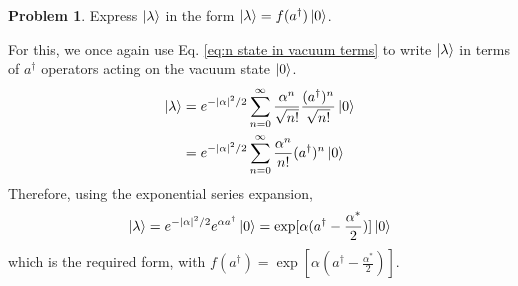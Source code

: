 \documentclass{article}
\theoremstyle{definition}
\newtheorem{definition}{Problem}[section]
\theoremstyle{remark}
\begin{document}
\begin{definition}
    Express $\ket{\lambda}$ in the form $\ket{\lambda} = f(a^\dagger)\ket{0}$.
\end{definition}
For this, we once again use Eq. \ref{eq:n state in vacuum terms} to write $\ket{\lambda}$ in terms of $a^\dagger$ operators acting on the vacuum state $\ket{0}$.
\begin{align*}
    \ket{\lambda} &= e^{-|\alpha|^2/2}\sum_{n=0}^\infty\frac{\alpha^n}{\sqrt{n!}}\frac{(a^\dagger)^n}{\sqrt{n!}}\ket{0}\\
                  &= e^{-|\alpha|^2/2}\sum_{n=0}^\infty\frac{\alpha^n}{n!}(a^\dagger)^n\ket{0}\\
\end{align*}
Therefore, using the exponential series expansion,
\begin{equation}
    \label{eq:lambda in a dagger}
    \ket{\lambda} = e^{-|\alpha|^2/2}e^{\alpha a^\dagger}\ket{0} = \exp[\alpha(a^\dagger-\frac{\alpha^*}{2})]\ket{0}
\end{equation}
which is the required form, with $f(a^\dagger) = \exp[\alpha(a^\dagger-\frac{\alpha^*}{2})]$.
\end{document}
